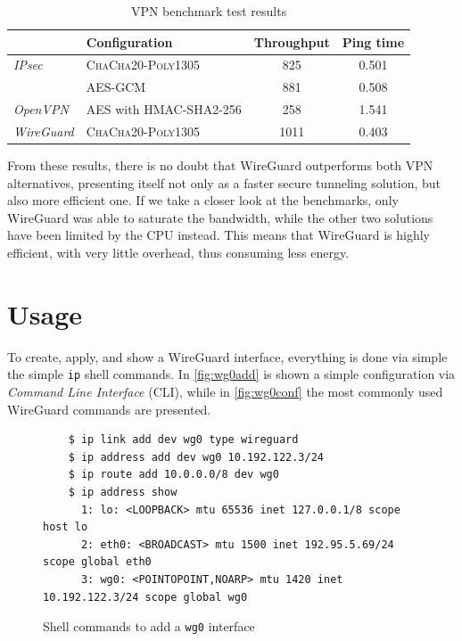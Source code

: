 \documentclass[light]{academica}
\begin{document}
\begin{table}[H]
  \centering
  \caption{VPN benchmark test results}
  \label{table:benchmark}
  \begin{tabular}{|l|l|c|c|}
    \hline
    & \textbf{Configuration} & \textbf{Throughput}\footnotemark {[Mbps]} & \textbf{Ping time}\footnotemark {[s]}\\
    \hline
    \textsl{IPsec} & \textsc{ChaCha20-Poly1305} & 825 & 0.501\\
          & AES-GCM & 881 & 0.508\\
    \textsl{OpenVPN} & AES with HMAC-SHA2-256 & 258 & 1.541\\
    \textsl{WireGuard} & \textsc{ChaCha20-Poly1305} & \cellcolor{blue!60} 1011 & \cellcolor{blue!60} 0.403 \\
    \hline
  \end{tabular}
\end{table}

From these results, there is no doubt that WireGuard outperforms both VPN alternatives, presenting itself not only as a faster secure tunneling solution, but also more efficient one.
If we take a closer look at the benchmarks, only WireGuard was able to saturate the bandwidth, while the other two solutions have been limited by the CPU instead.
This means that WireGuard is highly efficient, with very little overhead, thus consuming less energy.

\chapter{Usage}\label{chap:usage}

To create, apply, and show a WireGuard interface, everything is done via simple the simple \texttt{ip} shell commands.
In \autoref{fig:wg0add} is shown a simple configuration via \textit{Command Line Interface} (CLI), while in \autoref{fig:wg0conf} the most commonly used WireGuard commands are presented.

\begin{figure}[H]
  \begin{verbatim}
    $ ip link add dev wg0 type wireguard
    $ ip address add dev wg0 10.192.122.3/24
    $ ip route add 10.0.0.0/8 dev wg0
    $ ip address show
      1: lo: <LOOPBACK> mtu 65536 inet 127.0.0.1/8 scope host lo
      2: eth0: <BROADCAST> mtu 1500 inet 192.95.5.69/24 scope global eth0
      3: wg0: <POINTOPOINT,NOARP> mtu 1420 inet 10.192.122.3/24 scope global wg0
  \end{verbatim}
  \caption{Shell commands to add a \texttt{wg0} interface~\cite[Chapter 4]{whitepaper}}
  \label{fig:wg0add}
\end{figure}
\end{document}
